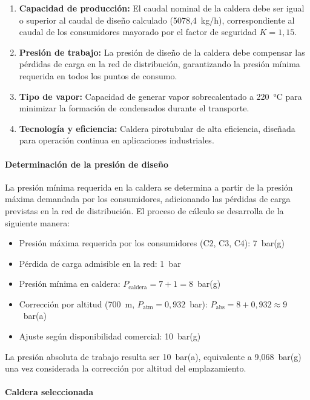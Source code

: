 \begin{enumerate}[label=\arabic*., leftmargin=2em]
	\item \textbf{Capacidad de producción:} El caudal nominal de la caldera debe ser igual o superior al caudal de diseño calculado (5078,4~kg/h), correspondiente al caudal de los consumidores mayorado por el factor de seguridad $K = 1{,}15$.
	\item \textbf{Presión de trabajo:} La presión de diseño de la caldera debe compensar las pérdidas de carga en la red de distribución, garantizando la presión mínima requerida en todos los puntos de consumo.
	\item \textbf{Tipo de vapor:} Capacidad de generar vapor sobrecalentado a 220~°C para minimizar la formación de condensados durante el transporte.
	\item \textbf{Tecnología y eficiencia:} Caldera pirotubular de alta eficiencia, diseñada para operación continua en aplicaciones industriales.
\end{enumerate}

\paragraph{Determinación de la presión de diseño}

La presión mínima requerida en la caldera se determina a partir de la presión máxima demandada por los consumidores, adicionando las pérdidas de carga previstas en la red de distribución. El proceso de cálculo se desarrolla de la siguiente manera:

\begin{itemize}[leftmargin=2em]
	\item Presión máxima requerida por los consumidores (C2, C3, C4): 7~bar(g)
	\item Pérdida de carga admisible en la red: 1~bar
	\item Presión mínima en caldera: $P_{\text{caldera}} = 7 + 1 = 8$~bar(g)
	\item Corrección por altitud (700~m, $P_{\text{atm}} = 0{,}932$~bar): $P_{\text{abs}} = 8 + 0{,}932 \approx 9$~bar(a)
	\item Ajuste según disponibilidad comercial: 10~bar(g)
\end{itemize}

La presión absoluta de trabajo resulta ser 10~bar(a), equivalente a 9,068~bar(g) una vez considerada la corrección por altitud del emplazamiento.

\paragraph{Caldera seleccionada}


